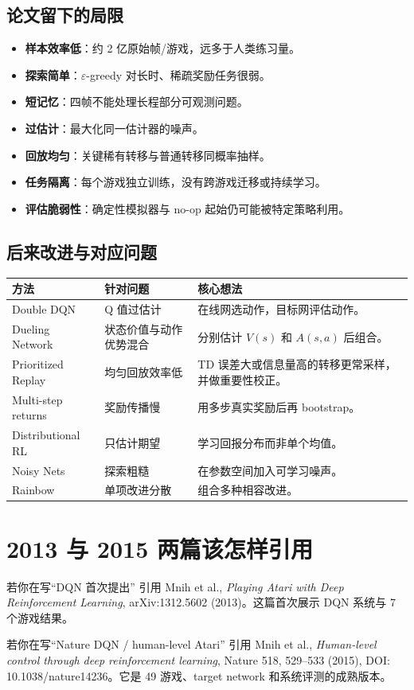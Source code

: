 \documentclass[UTF8,11pt]{ctexart}
\begin{document}
\subsection{论文留下的局限}
\begin{itemize}
\item \textbf{样本效率低}：约 2 亿原始帧/游戏，远多于人类练习量。
\item \textbf{探索简单}：$\varepsilon$-greedy 对长时、稀疏奖励任务很弱。
\item \textbf{短记忆}：四帧不能处理长程部分可观测问题。
\item \textbf{过估计}：最大化同一估计器的噪声。
\item \textbf{回放均匀}：关键稀有转移与普通转移同概率抽样。
\item \textbf{任务隔离}：每个游戏独立训练，没有跨游戏迁移或持续学习。
\item \textbf{评估脆弱性}：确定性模拟器与 no-op 起始仍可能被特定策略利用。
\end{itemize}

\subsection{后来改进与对应问题}
\begin{longtable}{p{}p{}p{}}
\toprule
方法 & 针对问题 & 核心想法\\
\midrule
Double DQN & Q 值过估计 & 在线网选动作，目标网评估动作。\\
Dueling Network & 状态价值与动作优势混合 & 分别估计 $V(s)$ 和 $A(s,a)$ 后组合。\\
Prioritized Replay & 均匀回放效率低 & TD 误差大或信息量高的转移更常采样，并做重要性校正。\\
Multi-step returns & 奖励传播慢 & 用多步真实奖励后再 bootstrap。\\
Distributional RL & 只估计期望 & 学习回报分布而非单个均值。\\
Noisy Nets & 探索粗糙 & 在参数空间加入可学习噪声。\\
Rainbow & 单项改进分散 & 组合多种相容改进。\\
\bottomrule
\end{longtable}

\section{2013 与 2015 两篇该怎样引用}
\begin{plainbox}{若你在写“DQN 首次提出”}
引用 Mnih et al., \textit{Playing Atari with Deep Reinforcement Learning}, arXiv:1312.5602 (2013)。这篇首次展示 DQN 系统与 7 个游戏结果。
\end{plainbox}
\begin{plainbox}{若你在写“Nature DQN / human-level Atari”}
引用 Mnih et al., \textit{Human-level control through deep reinforcement learning}, Nature 518, 529--533 (2015), DOI: 10.1038/nature14236。它是 49 游戏、target network 和系统评测的成熟版本。
\end{plainbox}
\end{document}
